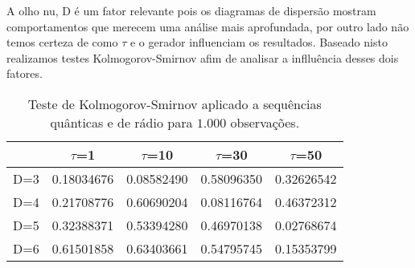 A olho nu, D é um fator relevante pois os diagramas de dispersão mostram comportamentos que merecem uma análise mais aprofundada, por outro lado não temos certeza de como $\tau$ e o gerador influenciam os resultados. Baseado nisto realizamos testes Kolmogorov-Smirnov afim de analisar a inflluência desses dois fatores.
\begin{table}
\begin{center}
\begin{tabular}{c | c | c | c | c}
\label{my-label}
  &    $\tau$=1   &   $\tau$=10   &   $\tau$=30   &   $\tau$=50   \\ \hline
D=3 & 0.18034676 & 0.08582490 & 0.58096350 & 0.32626542 \\
D=4 & 0.21708776 & 0.60690204 & 0.08116764 & 0.46372312  \\
D=5 & 0.32388371 & 0.53394280 & 0.46970138 & 0.02768674  \\
D=6 & 0.61501858 & 0.63403661 & 0.54795745 & 0.15353799  \\
\end{tabular}
\caption{Teste de Kolmogorov-Smirnov aplicado a sequências quânticas e de rádio para $1.000$ observações.}
\end{center}
\end{table}

%
%
%

